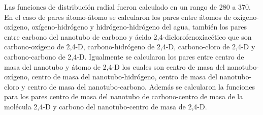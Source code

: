Las funciones de distribución radial fueron calculado en un rango de 280 a 370. En el caso de pares átomo-átomo se calcularon los pares entre átomos de oxígeno-oxígeno, oxígeno-hidrógeno y hidrógeno-hidrógeno del agua, también los pares entre carbono del nanotubo de carbono y ácido 2,4-diclorofenoxiacético que son carbono-oxígeno de 2,4-D, carbono-hidrógeno de 2,4-D, carbono-cloro de 2,4-D y carbono-carbono de 2,4-D. Igualmente se calcularon los pares entre centro de masa del nanotubo y átomo de 2,4-D los cuales son centro de masa del nanotubo-oxígeno, centro de masa del nanotubo-hidrógeno, centro de masa del nanotubo-cloro y centro de masa del nanotubo-carbono. Además se calcularon la funciones para los pares centro de masa del nanotubo de carbono-centro de masa de la molécula 2,4-D y carbono del nanotubo-centro de masa de 2,4-D.\\

